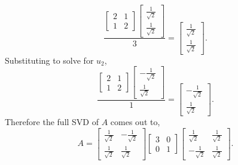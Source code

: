 \documentclass[12pt]{article}
\makeatletter
\theoremstyle{homework}
\newenvironment{exercise}[1]
{\def\@currentlabel{#1}\exercisecore}
{\endexercisecore}
\makeatother
\begin{document}
\begin{exercise}{P10}
\begin{enumerate}
  \begin{equation*}
    \dfrac{
      \begin{bmatrix}
        2 & 1\\
        1 & 2
      \end{bmatrix}
      \begin{bmatrix}
        \frac{1}{\sqrt{2}} \\
        \frac{1}{\sqrt{2}} 
      \end{bmatrix}}{3} = 
      \begin{bmatrix}
        \frac{1}{\sqrt{2}} \\
        \frac{1}{\sqrt{2}} 
      \end{bmatrix}.
  \end{equation*}
  Substituting to solve for $u_2$, 
  \begin{equation*}
    \dfrac{
      \begin{bmatrix}
        2 & 1\\
        1 & 2
      \end{bmatrix}
      \begin{bmatrix}
        -\frac{1}{\sqrt{2}} \\
        \frac{1}{\sqrt{2}} 
      \end{bmatrix}}{1} = 
      \begin{bmatrix}
        -\frac{1}{\sqrt{2}} \\
        \frac{1}{\sqrt{2}} 
      \end{bmatrix}.
  \end{equation*}
  Therefore the full SVD of $A$ comes out to, 
  \begin{equation*}
    A = 
    \begin{bmatrix}
      \frac{1}{\sqrt{2}} & -\frac{1}{\sqrt{2}} \\
      \frac{1}{\sqrt{2}} & \frac{1}{\sqrt{2}}
    \end{bmatrix}
    \begin{bmatrix}
      3 & 0\\
      0 & 1
    \end{bmatrix}
    \begin{bmatrix}
      \frac{1}{\sqrt{2}} & \frac{1}{\sqrt{2}}\\
      -\frac{1}{\sqrt{2}} & \frac{1}{\sqrt{2}}
    \end{bmatrix}.
  \end{equation*}
  \end{enumerate}
\end{exercise}
\vspace{.25in}
\end{document}
